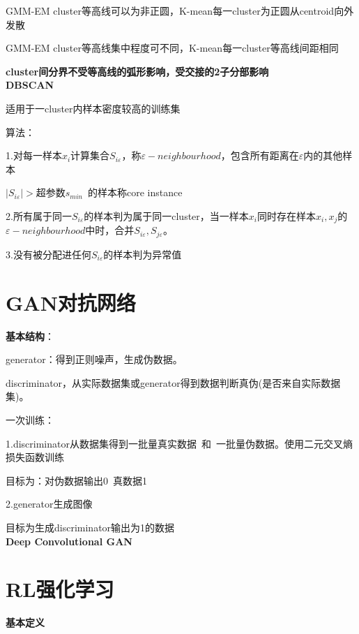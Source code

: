 \documentclass[UTF8]{ctexart}
\begin{document}
  \quad GMM-EM cluster等高线可以为非正圆，K-mean每一cluster为正圆从centroid向外发散
  
  \quad GMM-EM cluster等高线集中程度可不同，K-mean每一cluster等高线间距相同
  
  \quad \quad \textbf{cluster间分界不受等高线的弧形影响，受交接的2子分部影响}\\
\textbf{DBSCAN}

  适用于一cluster内样本密度较高的训练集

  算法：

  \quad 1.对每一样本$x_i$计算集合$S_{i\varepsilon}$，称$\varepsilon -neighbourhood$，包含所有距离在$\varepsilon $内的其他样本

  \quad \quad $|S_{i\varepsilon}| > $超参数$s_{min}$\ 的样本称core instance

  \quad 2.所有属于同一$S_{i\varepsilon }$的样本判为属于同一cluster，当一样本$x_i$同时存在样本$x_i, x_j$的$\varepsilon -neighbourhood$中时，合并$S_{i\varepsilon }, S_{j\varepsilon }$。

  \quad 3.没有被分配进任何$S_{i\varepsilon }$的样本判为异常值

\section{GAN对抗网络}
\noindent \textbf{基本结构}：

  generator：得到正则噪声，生成伪数据。
  
  discriminator，从实际数据集或generator得到数据判断真伪(是否来自实际数据集)。

  一次训练：

  \quad 1.discriminator从数据集得到一批量真实数据\ 和\ 一批量伪数据。使用二元交叉熵损失函数训练

  \quad \quad 目标为：对伪数据输出0\ 真数据1

  \quad 2.generator生成图像
  
  \quad \quad 目标为生成discriminator输出为1的数据\\
\textbf{Deep Convolutional GAN}


\section{RL强化学习}
\noindent \textbf{基本定义}
\end{document}
